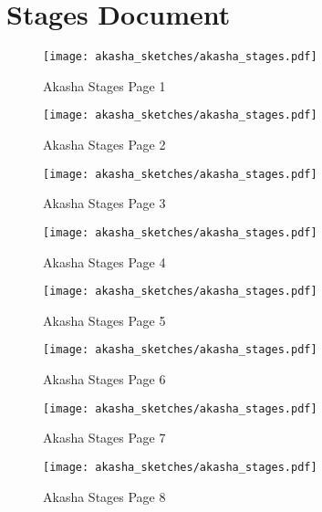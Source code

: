 \section{Stages Document}

\begin{figure}[H] %
    \texttt{[image: akasha\_sketches/akasha\_stages.pdf]}
    \caption{Akasha Stages Page 1}
    \label{fig:akashastagessketch-1}
\end{figure}

\begin{figure}[H] %
    \texttt{[image: akasha\_sketches/akasha\_stages.pdf]}
    \caption{Akasha Stages Page 2}
    \label{fig:akashastagessketch-2}
\end{figure}

\begin{figure}[H] %
    \texttt{[image: akasha\_sketches/akasha\_stages.pdf]}
    \caption{Akasha Stages Page 3}
    \label{fig:akashastagessketch-3}
\end{figure}

\begin{figure}[H] %
    \texttt{[image: akasha\_sketches/akasha\_stages.pdf]}
    \caption{Akasha Stages Page 4}
    \label{fig:akashastagessketch-4}
\end{figure}

\begin{figure}[H] %
    \texttt{[image: akasha\_sketches/akasha\_stages.pdf]}
    \caption{Akasha Stages Page 5}
    \label{fig:akashastagessketch-5}
\end{figure}

\begin{figure}[H] %
    \texttt{[image: akasha\_sketches/akasha\_stages.pdf]}
    \caption{Akasha Stages Page 6}
    \label{fig:akashastagessketch-6}
\end{figure}

\begin{figure}[H] %
    \texttt{[image: akasha\_sketches/akasha\_stages.pdf]}
    \caption{Akasha Stages Page 7}
    \label{fig:akashastagessketch-7}
\end{figure}

\begin{figure}[H] %
    \texttt{[image: akasha\_sketches/akasha\_stages.pdf]}
    \caption{Akasha Stages Page 8}
    \label{fig:akashastagessketch-8}
\end{figure}

